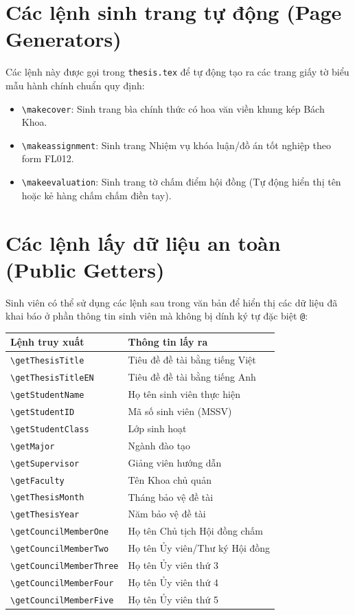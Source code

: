 \section{Các lệnh sinh trang tự động (Page Generators)}

Các lệnh này được gọi trong \texttt{thesis.tex} để tự động tạo ra các trang giấy tờ biểu mẫu hành chính chuẩn quy định:
\begin{itemize}
  \item \verb|\makecover|: Sinh trang bìa chính thức có hoa văn viền khung kép Bách Khoa.
  \item \verb|\makeassignment|: Sinh trang Nhiệm vụ khóa luận/đồ án tốt nghiệp theo form FL012.
  \item \verb|\makeevaluation|: Sinh trang tờ chấm điểm hội đồng (Tự động hiển thị tên hoặc kẻ hàng chấm chấm điền tay).
\end{itemize}

\section{Các lệnh lấy dữ liệu an toàn (Public Getters)}

Sinh viên có thể sử dụng các lệnh sau trong văn bản để hiển thị các dữ liệu đã khai báo ở phần thông tin sinh viên mà không bị dính ký tự đặc biệt \texttt{@}:
\begin{center}
\begin{tabular}{ll}
  \toprule
  \textbf{Lệnh truy xuất} & \textbf{Thông tin lấy ra} \\
  \midrule
  \verb|\getThesisTitle|    & Tiêu đề đề tài bằng tiếng Việt \\
  \verb|\getThesisTitleEN|  & Tiêu đề đề tài bằng tiếng Anh \\
  \verb|\getStudentName|     & Họ tên sinh viên thực hiện \\
  \verb|\getStudentID|       & Mã số sinh viên (MSSV) \\
  \verb|\getStudentClass|    & Lớp sinh hoạt \\
  \verb|\getMajor|           & Ngành đào tạo \\
  \verb|\getSupervisor|      & Giảng viên hướng dẫn \\
  \verb|\getFaculty|         & Tên Khoa chủ quản \\
  \verb|\getThesisMonth|     & Tháng bảo vệ đề tài \\
  \verb|\getThesisYear|      & Năm bảo vệ đề tài \\
  \verb|\getCouncilMemberOne| & Họ tên Chủ tịch Hội đồng chấm \\
  \verb|\getCouncilMemberTwo| & Họ tên Ủy viên/Thư ký Hội đồng \\
  \verb|\getCouncilMemberThree| & Họ tên Ủy viên thứ 3 \\
  \verb|\getCouncilMemberFour| & Họ tên Ủy viên thứ 4 \\
  \verb|\getCouncilMemberFive| & Họ tên Ủy viên thứ 5 \\
  \bottomrule
\end{tabular}
\end{center}

